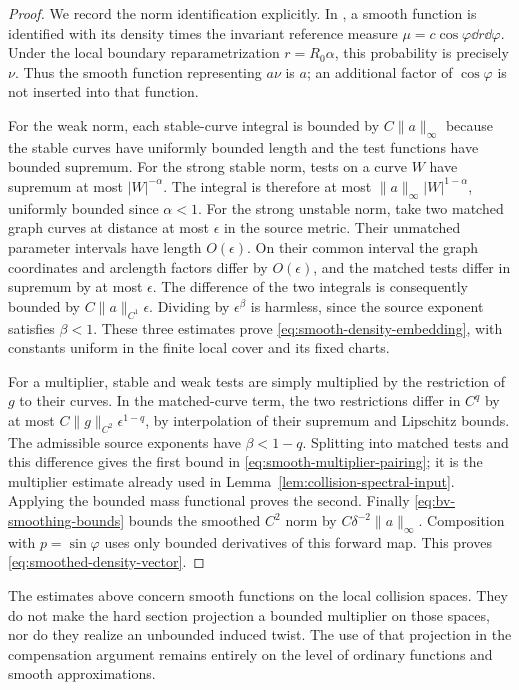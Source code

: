 \begin{proof}
We record the norm identification explicitly. In
\cite[Sections 3.2--3.3, (3.11)--(3.13)]{DZ}, a smooth function is
identified with its density times the invariant reference measure
$\mu=c\cos\varphi\dd r\dd\varphi$. Under the local boundary
reparametrization $r=R_0\alpha$, this probability is precisely $\nu$.
Thus the smooth function representing $a\nu$ is $a$; an additional
factor of $\cos\varphi$ is not inserted into that function.

For the weak norm, each stable-curve integral is bounded by
$C\|a\|_\infty$ because the stable curves have uniformly bounded
length and the test functions have bounded supremum. For the strong
stable norm, tests on a curve $W$ have supremum at most $|W|^{-\alpha}$.
The integral is therefore at most
$\|a\|_\infty |W|^{1-\alpha}$, uniformly bounded since $\alpha<1$.
For the strong unstable norm, take two matched graph curves at distance
at most $\epsilon$ in the source metric. Their unmatched parameter
intervals have length $O(\epsilon)$. On their common interval the graph
coordinates and arclength factors differ by $O(\epsilon)$, and the
matched tests differ in supremum by at most $\epsilon$.
The difference of the two integrals is consequently bounded by
$C\|a\|_{C^1}\epsilon$. Dividing by $\epsilon^\beta$ is harmless,
since the source exponent satisfies $\beta<1$. These three estimates
prove \eqref{eq:smooth-density-embedding}, with constants uniform in
the finite local cover and its fixed charts.

For a multiplier, stable and weak tests are simply multiplied by the
restriction of $g$ to their curves. In the matched-curve term, the two
restrictions differ in $C^q$ by at most
$C\|g\|_{C^2}\epsilon^{1-q}$, by interpolation of their supremum
and Lipschitz bounds. The admissible source exponents have
$\beta<1-q$. Splitting into matched tests and this difference gives
the first bound in \eqref{eq:smooth-multiplier-pairing}; it is the
multiplier estimate already used in
Lemma~\ref{lem:collision-spectral-input}. Applying the bounded mass
functional proves the second. Finally
\eqref{eq:bv-smoothing-bounds} bounds the smoothed $C^2$ norm by
$C\delta^{-2}\|a\|_\infty$. Composition with $p=\sin\varphi$
uses only bounded derivatives of this forward map. This proves
\eqref{eq:smoothed-density-vector}.
\end{proof}

The estimates above concern smooth functions on the local collision
spaces. They do not make the hard section projection a bounded
multiplier on those spaces, nor do they realize an unbounded induced
twist. The use of that projection in the compensation argument remains
entirely on the level of ordinary functions and smooth approximations.
